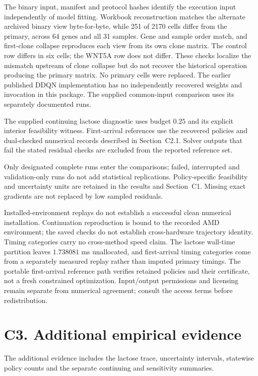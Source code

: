 \documentclass[11pt]{article}
\newcommand{\1}{\mathbf{1}}
\begin{document}
The binary input, manifest and protocol hashes identify the execution input independently of model fitting. Workbook reconstruction matches the alternate archived binary view byte-for-byte, while 251 of 2170 cells differ from the primary, across 64 genes and all 31 samples. Gene and sample order match, and first-clone collapse reproduces each view from its own clone matrix. The control row differs in six cells; the WNT5A row does not differ. These checks localize the mismatch upstream of clone collapse but do not recover the historical operation producing the primary matrix. No primary cells were replaced. The earlier published DDQN implementation has no independently recovered weights and invocation in this package. The supplied common-input comparison uses its separately documented runs.

The supplied continuing lactose diagnostic uses budget $0.25$ and its explicit interior feasibility witness. First-arrival references use the recovered policies and dual-checked numerical records described in Section~C2.1. Solver outputs that fail the stated residual checks are excluded from the reported reference set.

Only designated complete runs enter the comparisons; failed, interrupted and validation-only runs do not add statistical replications. Policy-specific feasibility and uncertainty units are retained in the results and Section~C1. Missing exact gradients are not replaced by low sampled residuals.

Installed-environment replays do not establish a successful clean numerical installation. Continuation reproduction is bound to the recorded AMD environment; the saved checks do not establish cross-hardware trajectory identity. Timing categories carry no cross-method speed claim. The lactose wall-time partition leaves $1.738081$ ms unallocated, and first-arrival timing categories come from a separately measured replay rather than imputed primary timings. The portable first-arrival reference path verifies retained policies and their certificate, not a fresh constrained optimization. Input/output permissions and licensing remain separate from numerical agreement; consult the access terms before redistribution.

\section*{C3. Additional empirical evidence}
\label{comp:sec:evidence}

The additional evidence includes the lactose trace, uncertainty intervals, statewise policy counts and the separate continuing and sensitivity summaries.
\end{document}
